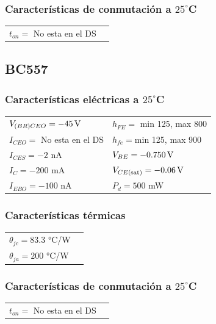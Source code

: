 \documentclass[chaptersright]{informeutn}
\begin{document}
    \subsubsection{Características de conmutación a $25^\circ$C}
    \begin{tabular}{ll}
    $t_{on} = $ No esta en el DS \\
    \end{tabular}


  \subsection{BC557}

    \subsubsection{Características eléctricas a $25^\circ$C}
    \begin{tabular}{ll}
    $V_{(BR)CEO} =  -45 \,\mathrm{V}$         & \hspace{2cm} $h_{FE} =$ min 125, max 800 \\
    $I_{CEO} = $ No esta en el DS           & \hspace{2cm} $h_{fe} = $min 125, max 900 \\
    $I_{CES} = -2 $ nA             & \hspace{2cm} $V_{BE} = -0.750 \,\mathrm{V} $ \\
    $I_C = -200$ mA                & \hspace{2cm} $V_{CE(\text{sat})} =-0.06 \,\mathrm{V} $ \\
    $I_{EBO} = -100$ nA              & \hspace{2cm} $P_d = 500$ mW \\
    \end{tabular}
    
    \subsubsection{Características térmicas}
    \begin{tabular}{ll}
    $\theta_{jc} = 83.3$ °C/W \\
    $\theta_{ja} = 200$ °C/W\\
    \end{tabular}
    
    \subsubsection{Características de conmutación a $25^\circ$C}
    \begin{tabular}{ll}
    $t_{on} = $ No esta en el DS \\
      \end{tabular}
\end{document}
